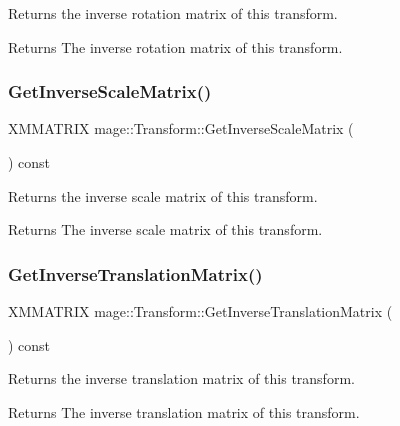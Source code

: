 Returns the inverse rotation matrix of this transform.

\begin{DoxyReturn}{Returns}
The inverse rotation matrix of this transform. 
\end{DoxyReturn}
\hypertarget{structmage_1_1_transform_a31da6a53e73a6254bc36cd0348c65cda}{}\label{structmage_1_1_transform_a31da6a53e73a6254bc36cd0348c65cda} 
\subsubsection{\texorpdfstring{Get\+Inverse\+Scale\+Matrix()}{GetInverseScaleMatrix()}}
{\footnotesize\ttfamily X\+M\+M\+A\+T\+R\+IX mage\+::\+Transform\+::\+Get\+Inverse\+Scale\+Matrix (\begin{DoxyParamCaption}{ }\end{DoxyParamCaption}) const\hspace{0.3cm}{\ttfamily [private]}}

Returns the inverse scale matrix of this transform.

\begin{DoxyReturn}{Returns}
The inverse scale matrix of this transform. 
\end{DoxyReturn}
\hypertarget{structmage_1_1_transform_a4cd7f7143c49772a83adfbd1d75dd475}{}\label{structmage_1_1_transform_a4cd7f7143c49772a83adfbd1d75dd475} 
\subsubsection{\texorpdfstring{Get\+Inverse\+Translation\+Matrix()}{GetInverseTranslationMatrix()}}
{\footnotesize\ttfamily X\+M\+M\+A\+T\+R\+IX mage\+::\+Transform\+::\+Get\+Inverse\+Translation\+Matrix (\begin{DoxyParamCaption}{ }\end{DoxyParamCaption}) const\hspace{0.3cm}{\ttfamily [private]}}

Returns the inverse translation matrix of this transform.

\begin{DoxyReturn}{Returns}
The inverse translation matrix of this transform. 
\end{DoxyReturn}
\hypertarget{structmage_1_1_transform_a4661691249d08ea41f9ee44f9838f0ed}{}\label{structmage_1_1_transform_a4661691249d08ea41f9ee44f9838f0ed} 
